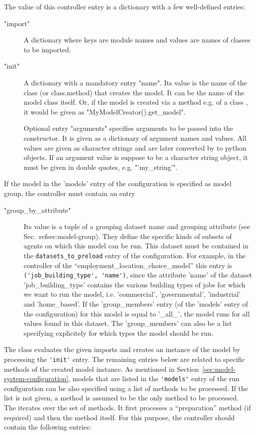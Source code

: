 The value of this controller entry is a dictionary with a few well-defined entries:
\begin{description}
\item["import"] A dictionary where keys are module names and values are names
  of classes to be imported.
\item["init"] A dictionary with a mandatory entry "name". Its value is the
  name of the class (or class.method) that creates the model. It can be the
  name of the model class itself.  Or, if the model is created via   a
  method e.g.  of a class , it would be
  given as "MyModelCreator().get_model".

  Optional entry "arguments" specifies arguments to be passed into the
  constructor. It is given as a dictionary of argument names and values. All
  values are given as character strings and are later converted by
   to python objects. If an argument value is suppose to be
  a character string object, it must be given in double quotes, e.g.
  "'my_string'".
\end{description}
If the model in the 'models' entry of the configuration is specified as model group, the controller must contain 
an entry
\begin{description}
\item["group_by_attribute"] Its value is a tuple of a grouping dataset name and grouping attribute (see Sec.~ref{sec:model-group}).
They define the specific kinds of 
subsets of agents on which this model can be run. This dataset must be contained in the 
\verb|datasets_to_preload| entry of the configuration. For example, in the controller of the 
``employment_location_choice_model'' this entry is
\verb|('job_building_type', 'name')|, since the attribute 'name' of the dataset 'job_building_type' contains the various
building types of jobs for which we want to run the model, i.e. 'commercial', 'governmental', 'industrial' and 'home_based'.
If the 'group_members' entry (of the 'models' entry of the configuration) for this model is equal to '_all_', the model runs 
for all values found in this dataset. The  'group_members' can also be a list specifying explicitely for which types the model 
should be run. 
\end{description}

The  class evaluates the given imports and creates an
instance of the model by processing the \verb|'init'| entry. The remaining entries
below are related to specific methods of the created model instance.  As
mentioned in Section~\ref{sec:model-system-configuration}, models 
that are listed in the \verb|'models'| entry of the run configuration can be also
specified using a list of methods to be processed. If the list is not given, a
method  is assumed to be the only method to be processed. The
 iterates over the set of methods. It first processes a
``preparation'' method (if required) and then the method itself. For this purpose,
the controller should contain the following entries:


